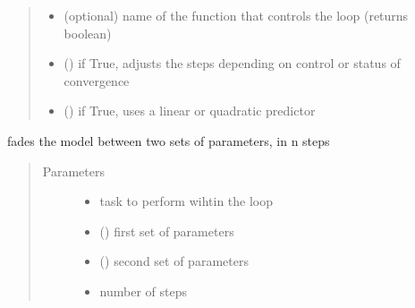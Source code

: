 \documentclass[letterpaper,10pt,english]{sphinxmanual}
\begin{document}
\begin{fulllineitems}
\begin{quote}
\begin{description}
\begin{itemize}
\item {} 
\sphinxAtStartPar
{} \textendash{} (optional) name of the function that controls the loop (returns boolean)

\item {} 
\sphinxAtStartPar
{} () \textendash{} if True, adjusts the steps depending on control or status of convergence

\item {} 
\sphinxAtStartPar
{} () \textendash{} if True, uses a linear or quadratic predictor

\end{itemize}

\end{description}\end{quote}

\end{fulllineitems}


\begin{fulllineitems}
\label{\detokenize{utilities:pyqcm.loop.fade}}
\sphinxAtStartPar
fades the model between two sets of parameters, in n steps
\begin{quote}\begin{description}
\item[{Parameters}] \leavevmode\begin{itemize}
\item {} 
\sphinxAtStartPar
{} \textendash{} task to perform wihtin the loop

\item {} 
\sphinxAtStartPar
{} () \textendash{} first set of parameters

\item {} 
\sphinxAtStartPar
{} () \textendash{} second set of parameters

\item {} 
\sphinxAtStartPar
{} \textendash{} number of steps

\end{itemize}

\end{description}\end{quote}

\end{fulllineitems}
\end{document}
